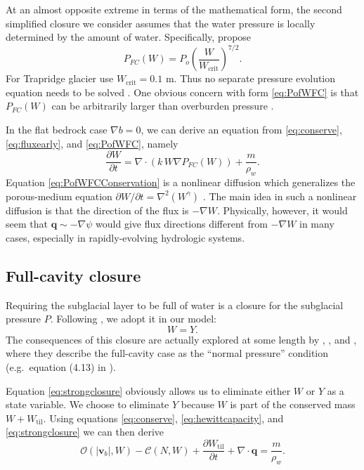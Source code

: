 \documentclass[gmd]{copernicus}   %
\newcommand{\text}{\textrm}
\newcommand\bv{\mathbf{v}}
\newcommand\bq{\mathbf{q}}
\newcommand{\ddt}[1]{\ensuremath{\frac{\partial #1}{\partial t}}}
\newcommand{\Div}{\nabla\cdot}
\newcommand{\grad}{\nabla}
\newcommand{\Wtil}{W_{\text{til}}}
\begin{document}
At an almost opposite extreme in terms of the mathematical form, the second simplified closure we consider assumes that the water pressure is locally determined by the amount of water.  Specifically, \cite{FlowersClarke2002_theory} propose
\begin{equation}
P_{FC}(W) = P_o \left(\frac{W}{W_{\text{crit}}}\right)^{7/2}. \label{eq:PofWFC}
\end{equation}
For Trapridge glacier \cite{FlowersClarke2002_trapridge} use $W_{\text{crit}}=0.1$ m.  Thus no separate pressure evolution equation needs to be solved \citep{PimentelFlowersSchoof2010,PimentelFlowers2011}.  One obvious concern with form \eqref{eq:PofWFC} is that $P_{FC}(W)$ can be arbitrarily larger than overburden pressure \citep{Schoofetal2012}.

In the flat bedrock case $\grad b = 0$, we can derive an equation from \eqref{eq:conserve}, \eqref{eq:fluxearly}, and \eqref{eq:PofWFC}, namely
\begin{equation}
\frac{\partial W}{\partial t} =  \Div \left(k\,W \grad P_{FC}(W)\right) + \frac{m}{\rho_w}. \label{eq:PofWFCConservation}
\end{equation}
Equation \eqref{eq:PofWFCConservation} is a nonlinear diffusion which generalizes the porous-medium equation $\partial W/\partial t = \grad^2 (W^\gamma)$ \citep{Schoofetal2012,VazquezPME}.  The main idea in such a nonlinear diffusion is that the direction of the flux is $-\grad W$.  Physically, however, it would seem that $\bq \sim -\grad \psi$ would give flux directions different from $-\grad W$ in many cases, especially in rapidly-evolving hydrologic systems.

\subsection{Full-cavity closure}  Requiring the subglacial layer to be full of water is a closure for the subglacial pressure $P$.  Following \cite{Bartholomausetal2011}, we adopt it in our model:
\begin{equation}
W = Y.\label{eq:strongclosure}
\end{equation}
The consequences of this closure are actually explored at some length by \cite{Schoofetal2012}, \cite{Hewittetal2012}, and \cite{Werderetal2013}, where they describe the full-cavity case as the ``normal pressure'' condition (e.g.~equation (4.13) in \cite{Schoofetal2012}).

Equation \eqref{eq:strongclosure} obviously allows us to eliminate either $W$ or $Y$ as a state variable.  We choose to eliminate $Y$ because $W$ is part of the conserved mass $W + \Wtil$.  Using equations \eqref{eq:conserve}, \eqref{eq:hewittcapacity}, and \eqref{eq:strongclosure} we can then derive
\begin{equation}
\mathcal{O}(|\bv_b|,W) - \mathcal{C}(N,W) + \ddt{\Wtil} + \Div\bq = \frac{m}{\rho_w}. \label{eq:elliptic}
\end{equation}
\end{document}
